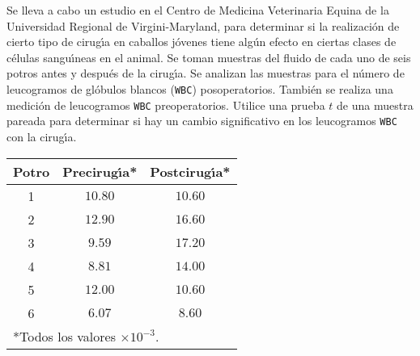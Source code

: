 \begin{enunciado}
 Se lleva a cabo un estudio en el Centro de Medicina Veterinaria Equina
 de la Universidad Regional de Virgini-Maryland, para determinar
 si la realizaci\'on de cierto tipo de cirug\'{\i}a en caballos j\'ovenes
 tiene alg\'un efecto en ciertas clases de c\'elulas sangu\'{\i}neas
 en el animal.
 Se toman muestras del fluido de cada uno de seis potros antes y despu\'es
 de la cirug\'{\i}a.
 Se analizan las muestras para el n\'umero de leucogramos
 de gl\'obulos blancos (\texttt{WBC}) posoperatorios.
 Tambi\'en se realiza una medici\'on de leucogramos \texttt{WBC}
 preoperatorios.
 Utilice una prueba $t$ de una muestra pareada
 para determinar si hay un cambio significativo en los leucogramos
 \texttt{WBC} con la cirug\'{\i}a.
 \begin{center}
  \begin{tabular}{ccc}
   \textbf{Potro} & \textbf{Precirug\'{\i}a*} & \textbf{Postcirug\'{\i}a*}
   \\
   \hline 
   1 & $10.80$ & $10.60$ \\
   2 & $12.90$ & $16.60$ \\
   3 & $ 9.59$ & $17.20$ \\
   4 & $ 8.81$ & $14.00$ \\
   5 & $12.00$ & $10.60$ \\
   6 & $ 6.07$ & $ 8.60$ \\
   \hline
   \multicolumn{3}{l}{*Todos los valores $\times 10^{-3}$.}
  \end{tabular}
 \end{center}
\end{enunciado}

